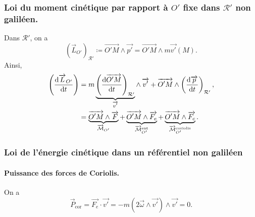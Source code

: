         \subsubsection{Loi du moment cinétique par rapport à $O'$ fixe dans $\mathcal{R}'$ non galiléen.}

            Dans $\mathcal{R}'$, on a
            \begin{equation}
                \left(\vec{L}_{O'}\right)_{\mathcal{R}'}\coloneqq\vec{O'M}\wedge\vec{p'}=\vec{O'M}\wedge m\vec{v'}(M).
            \end{equation}
            Ainsi,
            \begin{align}
                \left(\frac{\mathrm{d} \protect\overrightarrow{{L}}_{O'}}{\mathrm{d} t}\right)
                &=
                m\underbrace{\left(\frac{\mathrm{d} \protect\overrightarrow{{O'M}}}{\mathrm{d} t}\right)_{\mathcal{R}'}}_{\protect\overrightarrow{{v'}}}\wedge\,\protect\overrightarrow{{v'}}+\protect\overrightarrow{{O'M}}\wedge\left(\frac{\mathrm{d}\protect\overrightarrow{{p}}}{\mathrm{d} t}\right)_{\mathcal{R}'},\\
                &=\underbrace{\protect\overrightarrow{{O'M}}\wedge \protect\overrightarrow{{F}}}_{\protect\overrightarrow{{\mathcal{M}}}_{O'}}+\underbrace{\protect\overrightarrow{{O'M}}\wedge\protect\overrightarrow{{F_e}}}_{\protect\overrightarrow{{\mathcal{M}}}^{\text{ent}}_{O'}}+\underbrace{\protect\overrightarrow{{O'M}}\wedge\protect\overrightarrow{{F_c}}}_{\protect\overrightarrow{{\mathcal{M}}}^{\text{coriolis}}_{O'}}.
            \end{align}

        \subsubsection{Loi de l'énergie cinétique dans un référentiel non galiléen}
            
            \paragraph{Puissance des forces de Coriolis.}
                On a 
                \begin{equation}
                    \vec{P}_{\text{cor}}=\vec{F_e}\cdot\vec{v'}=-m\left(2\vec{\omega}\wedge\vec{v'}\right)\wedge\vec{v'}=0.
                \end{equation}
            
